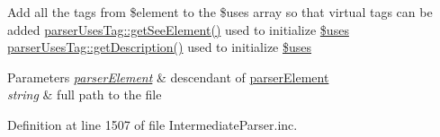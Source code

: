 \-Add all the  tags from \$element to the \$uses array so that  virtual tags can be added  \hyperlink{classparser_uses_tag_a50a571908126fc3a550f24f0527660bd}{parser\-Uses\-Tag\-::get\-See\-Element()} used to initialize \hyperlink{classphp_documentor___intermediate_parser_af050f1d6cfed92e5511909eba5754516}{\$uses}  \hyperlink{classparser_uses_tag_a2e7bb35c71bf1824456ceb944cb7a845}{parser\-Uses\-Tag\-::get\-Description()} used to initialize \hyperlink{classphp_documentor___intermediate_parser_af050f1d6cfed92e5511909eba5754516}{\$uses} 
\begin{DoxyParams}{\-Parameters}
{\em \hyperlink{classparser_element}{parser\-Element}} & descendant of \hyperlink{classparser_element}{parser\-Element} \\
\hline
{\em string} & full path to the file \\
\hline
\end{DoxyParams}


\-Definition at line 1507 of file \-Intermediate\-Parser.\-inc.


